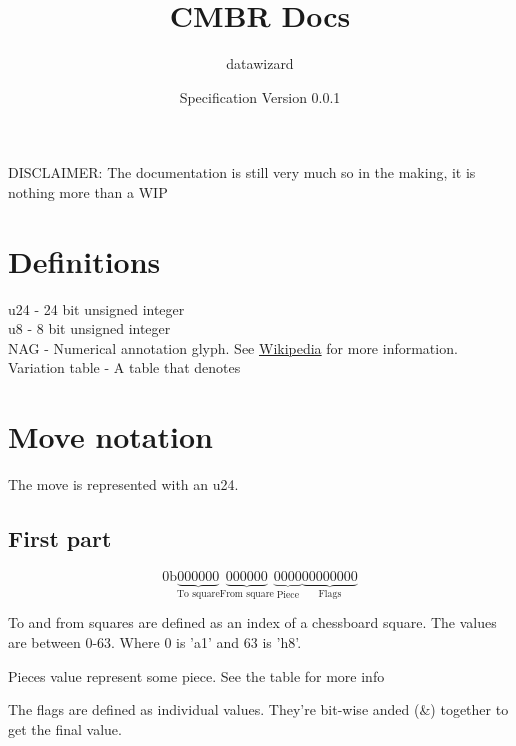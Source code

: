 \documentclass{article}
\title{CMBR Docs}
\author{datawizard}
\date{Specification Version 0.0.1}
\begin{document}
\maketitle

DISCLAIMER: The documentation is still very much so in the making, it is nothing more than a WIP

\section{Definitions}
u24 - 24 bit unsigned integer \\
u8  - 8  bit unsigned integer \\
NAG - Numerical annotation glyph. See \href{https://w.wiki/AWUT}{Wikipedia} for more information. \\
Variation table - A table that denotes  \\

\section{Move notation}
The move is represented with an u24.
\subsection{First part}
\begin{equation}
    0\text{b}\underbrace{000000}_\text{To square} \underbrace{000000}_\text{From square}
    \underbrace{0000}_\text{Piece}\underbrace{00000000}_\text{Flags}
\end{equation}

To and from squares are defined as an index of a chessboard square. The values are between 0-63. Where 0 is 'a1' and 63 is 'h8'.
\par Pieces value represent some piece. See the table for more info
\par The flags are defined as individual values. They're bit-wise anded (\&) together to get the final value.
\end{document}
